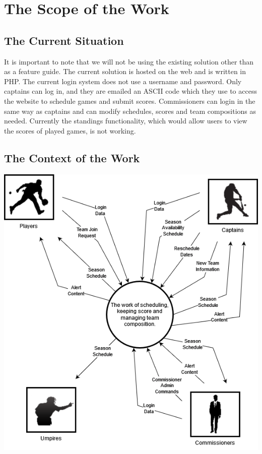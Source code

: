 \documentclass[12pt]{article}
\begin{document}
\section{The Scope of the Work}
\subsection{The Current Situation}
It is important to note that we will not be using the existing solution other
than as a feature guide. The current solution is hosted on the web and is
written in PHP. The current login system does not use a username and password.
Only captains can log in, and they are emailed an ASCII code which they use to
access the website to schedule games and submit scores. Commissioners can login
in the same way as captains and can modify schedules, scores and team
compositions as needed. Currently the standings functionality, which would
allow users to view the scores of played games, is not working.
\subsection{The Context of the Work}
\includegraphics[scale=0.6]{6b_context_diagram.png}
\end{document}
